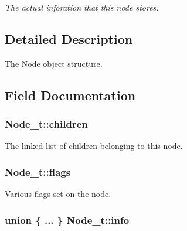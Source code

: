 \begin{DoxyCompactItemize}
\begin{tabbing}
\end{tabbing}\begin{DoxyCompactList}\small\item\em The actual inforation that this node stores. \end{DoxyCompactList}\end{DoxyCompactItemize}


\subsection{Detailed Description}
The Node object structure. 

\subsection{Field Documentation}
\subsubsection[{\texorpdfstring{children}{children}}]{ Node\+\_\+t\+::children}\hypertarget{struct_node__t_a6cf3b7ad27e888d73383d3a75f8684c1}{}\label{struct_node__t_a6cf3b7ad27e888d73383d3a75f8684c1}


The linked list of children belonging to this node. 

\subsubsection[{\texorpdfstring{flags}{flags}}]{ Node\+\_\+t\+::flags}\hypertarget{struct_node__t_a53b71bbcaeea959963146a4150dc42e3}{}\label{struct_node__t_a53b71bbcaeea959963146a4150dc42e3}


Various flags set on the node. 

\subsubsection[{\texorpdfstring{info}{info}}]{\setlength{\rightskip}{0pt plus 5cm}union \{ ... \} 
     Node\+\_\+t\+::info}\hypertarget{struct_node__t_af6bb9c6789c0c8c94450df6ef4704070}{}\label{struct_node__t_af6bb9c6789c0c8c94450df6ef4704070}


